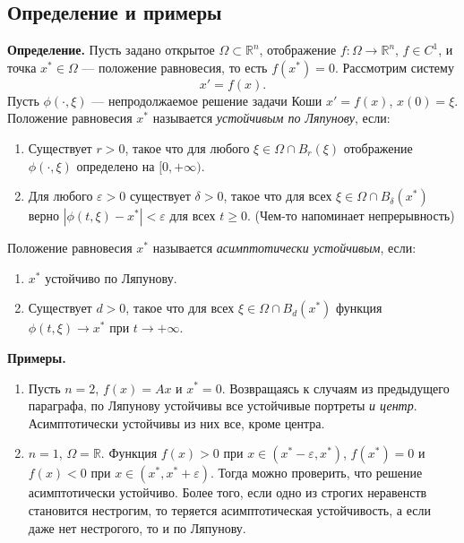 \subsection{Определение и примеры}
\textbf{Определение.} Пусть задано открытое $\Omega \subset \mathbb R^n$, отображение $f: \Omega \to \mathbb R^n$, $f \in C^1$, и точка $x^* \in \Omega$ --- положение равновесия, то есть $f(x^*) = 0$.
Рассмотрим систему
\begin{equation}
    x' = f(x).
\end{equation}
Пусть $\phi(\cdot, \xi)$ --- непродолжаемое решение задачи Коши $x' = f(x)$, $x(0) = \xi$.
Положение равновесия $x^*$ называется \textit{устойчивым по Ляпунову}, если:
\begin{enumerate}
    \item Существует $r > 0$, такое что для любого $\xi \in \Omega \cap B_r(\xi)$ отображение $\phi(\cdot, \xi)$ определено на $[0, +\infty)$.
    \item Для любого $\varepsilon > 0$ существует $\delta > 0$, такое что для всех $\xi \in \Omega \cap B_\delta(x^*)$ верно $|\phi(t, \xi) - x^*| < \varepsilon$ для всех $t \ge 0$.
        (Чем-то напоминает непрерывность)
\end{enumerate}

Положение равновесия $x^*$ называется \textit{асимптотически устойчивым}, если:
\begin{enumerate}
    \item $x^*$ устойчиво по Ляпунову.
    \item Существует $d > 0$, такое что для всех $\xi \in \Omega \cap B_d(x^*)$ функция $\phi(t, \xi) \to x^*$ при $t \to +\infty$.
\end{enumerate}

\textbf{Примеры.} 
\begin{enumerate}
    \item Пусть $n = 2$, $f(x) = Ax$ и $x^* = 0$.
        Возвращаясь к случаям из предыдущего параграфа, по Ляпунову устойчивы все устойчивые портреты \textit{и центр}.
        Асимптотически устойчивы из них все, кроме центра.
    
    \item $n = 1$, $\Omega = \mathbb R$. Функция $f(x) > 0$ при $x \in (x^* - \varepsilon, x^*)$, $f(x^*) = 0$ и $f(x) < 0$ при $x \in (x^*, x^* + \varepsilon)$.
        Тогда можно проверить, что решение асимптотически устойчиво.
        Более того, если одно из строгих неравенств становится нестрогим, то теряется асимптотическая устойчивость, а если даже нет нестрогого, то и по Ляпунову.
\end{enumerate}


